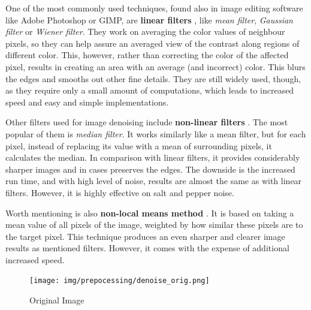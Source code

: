 \begin{description}

\item One of the most commonly used techniques, found also in image editing software like Adobe Photoshop or GIMP, are \textbf{linear filters} \citep{denoisingTechniques}, like \emph{mean filter}, \emph{Gaussian filter} or \emph{Wiener filter}. They work on averaging the color values of neighbour pixels, so they can help assure an averaged view of the contrast along regions of different color. This, however, rather than correcting the color of the affected pixel, results in creating an area with an average (and incorrect) color. This blurs the edges and smooths out other fine details. They are still widely used, though, as they require only a small amount of computations, which leads to increased speed and easy and simple implementations.

\item Other filters used for image denoising include \textbf{non-linear filters} \citep{denoisingTechniques}. The most popular of them is \emph{median filter}. It works similarly like a mean filter, but for each pixel, instead of replacing its value with a mean of surrounding pixels, it calculates the median. In comparison with linear filters, it provides considerably sharper images and in cases preserves the edges. The downside is the increased run time, and with high level of noise, results are almost the same as with linear filters. However, it is highly effective on salt and pepper noise.

\item Worth mentioning is also \textbf{non-local means method} \citep{nonLocalMeans}. It is based on taking a mean value of all pixels of the image, weighted by how similar these pixels are to the target pixel. This technique produces an even sharper and clearer image results as mentioned filters. However, it comes with the expense of additional increased speed.

\end{description}

\begin{figure}[H]
\centering
\texttt{[image: img/prepocessing/denoise\_orig.png]}
\caption{Original Image} \label{fig:1a}
\end{figure}

